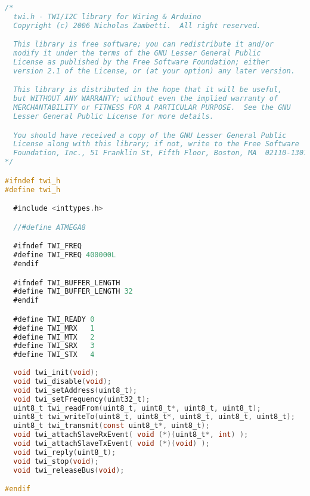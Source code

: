 \begin{lstlisting}[language=C, label={lst:modified_twi_h}, caption=Modifizierte \emph{twi.h} um \ac{I2C} im \emph{Fast-Mode} zu betreiben]
/*
  twi.h - TWI/I2C library for Wiring & Arduino
  Copyright (c) 2006 Nicholas Zambetti.  All right reserved.

  This library is free software; you can redistribute it and/or
  modify it under the terms of the GNU Lesser General Public
  License as published by the Free Software Foundation; either
  version 2.1 of the License, or (at your option) any later version.

  This library is distributed in the hope that it will be useful,
  but WITHOUT ANY WARRANTY; without even the implied warranty of
  MERCHANTABILITY or FITNESS FOR A PARTICULAR PURPOSE.  See the GNU
  Lesser General Public License for more details.

  You should have received a copy of the GNU Lesser General Public
  License along with this library; if not, write to the Free Software
  Foundation, Inc., 51 Franklin St, Fifth Floor, Boston, MA  02110-1301  USA
*/

#ifndef twi_h
#define twi_h

  #include <inttypes.h>

  //#define ATMEGA8

  #ifndef TWI_FREQ
  #define TWI_FREQ 400000L
  #endif

  #ifndef TWI_BUFFER_LENGTH
  #define TWI_BUFFER_LENGTH 32
  #endif

  #define TWI_READY 0
  #define TWI_MRX   1
  #define TWI_MTX   2
  #define TWI_SRX   3
  #define TWI_STX   4
  
  void twi_init(void);
  void twi_disable(void);
  void twi_setAddress(uint8_t);
  void twi_setFrequency(uint32_t);
  uint8_t twi_readFrom(uint8_t, uint8_t*, uint8_t, uint8_t);
  uint8_t twi_writeTo(uint8_t, uint8_t*, uint8_t, uint8_t, uint8_t);
  uint8_t twi_transmit(const uint8_t*, uint8_t);
  void twi_attachSlaveRxEvent( void (*)(uint8_t*, int) );
  void twi_attachSlaveTxEvent( void (*)(void) );
  void twi_reply(uint8_t);
  void twi_stop(void);
  void twi_releaseBus(void);

#endif
\end{lstlisting}

